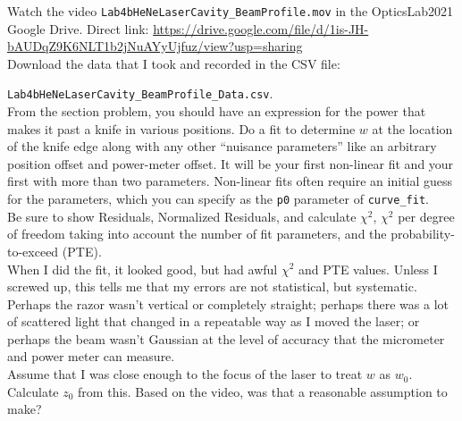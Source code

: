 \documentclass[11pt]{hmcpset}
\begin{document}
\begin{problem}
	Watch the video \texttt{Lab4bHeNeLaserCavity\_BeamProfile.mov} in the OpticsLab2021 Google Drive. Direct link: \url{https://drive.google.com/file/d/1is-JH-bAUDqZ9K6NLT1b2jNuAYyUjfuz/view?usp=sharing} \\
	
	Download the data that I took and recorded in the CSV file:
	
	\texttt{Lab4bHeNeLaserCavity\_BeamProfile\_Data.csv}. \\
	
	From the section problem, you should have an expression for the power that makes it past a knife in various positions. Do a fit to determine $w$ at the location of the knife edge along with any other ``nuisance parameters'' like an arbitrary position offset and power-meter offset. It will be your first non-linear fit and your first with more than two parameters. Non-linear fits often require an initial guess for the parameters, which you can specify as the \texttt{p0} parameter of \texttt{curve\_fit}. \\
	
	Be sure to show Residuals, Normalized Residuals, and calculate $\chi^2$, $\chi^2$ per degree of freedom taking into account the number of fit parameters, and the probability-to-exceed (PTE). \\
	
	When I did the fit, it looked good, but had awful $\chi^2$ and PTE values. Unless I screwed up, this tells me that my errors are not statistical, but systematic. Perhaps the razor wasn't vertical or completely straight; perhaps there was a lot of scattered light that changed in a repeatable way as I moved the laser; or perhaps the beam wasn't Gaussian at the level of accuracy that the micrometer and power meter can measure. \\
	
	Assume that I was close enough to the focus of the laser to treat $w$ as $w_0$. Calculate $z_0$ from this. Based on the video, was that a reasonable assumption to make?
\end{problem}

\begin{solution}
	\vfill
\end{solution}
\pagebreak
\end{document}
